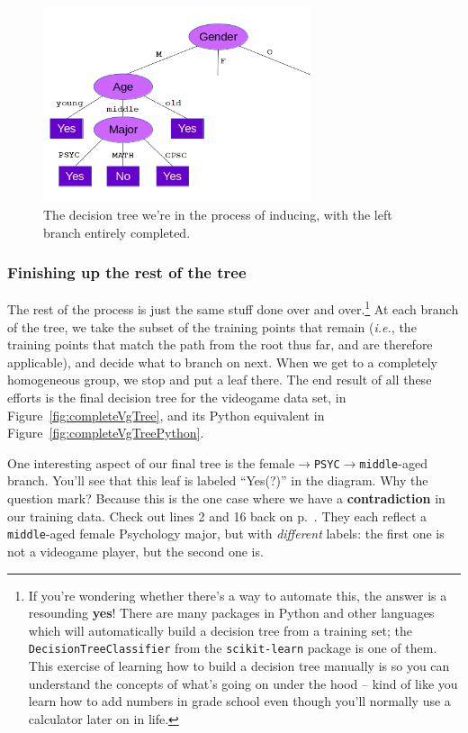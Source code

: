 \begin{figure}[ht]
\centering
\includegraphics[width=0.7\textwidth]{maleAgeMiddleWithPsyc.png}
\caption{The decision tree we're in the process of inducing, with the left
branch entirely completed.}
\label{fig:maleAgeMiddleWithPsyc}
\end{figure}

\subsubsection{Finishing up the rest of the tree}

The rest of the process is just the same stuff done over and over.\footnote{If
you're wondering whether there's a way to automate this, the answer is a
resounding \textbf{yes}! There are many packages in Python and other languages
which will automatically build a decision tree from a training set; the
\texttt{DecisionTreeClassifier} from the \texttt{scikit-learn} package is one
of them. This exercise of learning how to build a decision tree manually is so
you can understand the concepts of what's going on under the hood -- kind of
like you learn how to add numbers in grade school even though you'll normally
use a calculator later on in life.} At each branch of the tree, we take the
subset of the training points that remain (\textit{i.e.}, the training points
that match the path from the root thus far, and are therefore applicable), and
decide what to branch on next. When we get to a completely homogeneous group,
we stop and put a leaf there. The end result of all these efforts is the final
decision tree for the videogame data set, in Figure~\ref{fig:completeVgTree},
and its Python equivalent in Figure~\ref{fig:completeVgTreePython}.


One interesting aspect of our final tree is the
female$\rightarrow$\texttt{PSYC}$\rightarrow$\texttt{middle}-aged branch.
You'll see that this leaf is labeled ``Yes(?)'' in the diagram. Why the
question mark? Because this is the one case where we have a
\textbf{contradiction} in our training data. Check out lines 2 and 16 back on
p.~\pageref{vgDataSet}. They each reflect a \texttt{middle}-aged female
Psychology major, but with \textit{different} labels: the first one is not a
videogame player, but the second one is.

